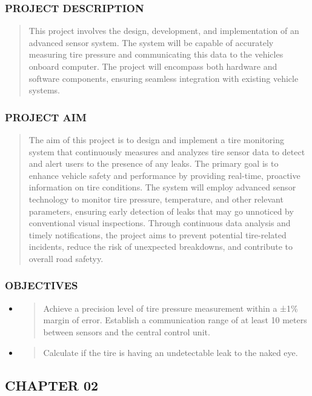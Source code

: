 \documentclass[
]{article}
\begin{document}
\hypertarget{project-description}{%
\subsubsection{PROJECT DESCRIPTION}\label{project-description}}

\begin{quote}
This project involves the design, development, and implementation of an
advanced sensor system. The system will be capable of accurately
measuring tire pressure and communicating this data to the
vehicle\textquotesingle s onboard computer. The project will encompass
both hardware and software components, ensuring seamless integration
with existing vehicle systems.
\end{quote}

\hypertarget{project-aim}{%
\subsubsection{PROJECT AIM}\label{project-aim}}

\begin{quote}
The aim of this project is to design and implement a tire monitoring
system that continuously measures and analyzes tire sensor data to
detect and alert users to the presence of any leaks. The primary goal is
to enhance vehicle safety and performance by providing real-time,
proactive information on tire conditions. The system will employ
advanced sensor technology to monitor tire pressure, temperature, and
other relevant parameters, ensuring early detection of leaks that may go
unnoticed by conventional visual inspections. Through continuous data
analysis and timely notifications, the project aims to prevent potential
tire-related incidents, reduce the risk of unexpected breakdowns, and
contribute to overall road safety\protect\hypertarget {_bookmark7}{}{}y.
\end{quote}

\hypertarget{objectives}{%
\subsubsection{OBJECTIVES}\label{objectives}}

\begin{itemize}
\item
  \begin{quote}
  Achieve a precision level of tire pressure measurement within a ±1\%
  margin of error. Establish a communication range of at least 10 meters
  between sensors and the central control unit.
  \end{quote}
\item
  \begin{quote}
  Calculate if the tire is having an undetectable leak to the naked
  eye\protect\hypertarget{_bookmark8}{}{}.
  \end{quote}
\end{itemize}
\newpage
\hypertarget{chapter-02}{%
\subsection{CHAPTER 02}\label{chapter-02}}
\end{document}
